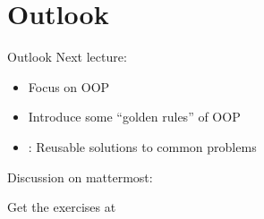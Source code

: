 \section{Outlook}

\begin{frame}{Outlook}
	Next lecture: 
	\begin{itemize}
		\item Focus on OOP
		\item Introduce some \enquote{golden rules} of OOP
		\item {}: Reusable solutions to common problems
	\end{itemize}

	\bigskip
	Discussion on mattermost: \href{https://mattermost.web.cern.ch/csc/channels/programming-paradigms}{}

	\bigskip
	Get the exercises at 
\end{frame}
